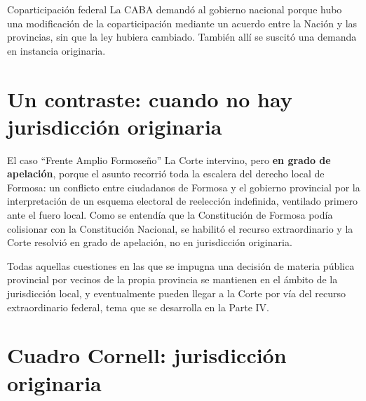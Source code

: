 \documentclass[12pt,oneside]{book}
\begin{document}
\begin{example}{Coparticipación federal}
La CABA demandó al gobierno nacional porque hubo una modificación de la coparticipación mediante un acuerdo entre la Nación y las provincias, sin que la ley hubiera cambiado. También allí se suscitó una demanda en instancia originaria.
\end{example}

\section{Un contraste: cuando no hay jurisdicción originaria}

\begin{example}{El caso ``Frente Amplio Formoseño''}
La Corte intervino, pero \textbf{en grado de apelación}, porque el asunto recorrió toda la escalera del derecho local de Formosa: un conflicto entre ciudadanos de Formosa y el gobierno provincial por la interpretación de un esquema electoral de reelección indefinida, ventilado primero ante el fuero local. Como se entendía que la Constitución de Formosa podía colisionar con la Constitución Nacional, se habilitó el recurso extraordinario y la Corte resolvió en grado de apelación, no en jurisdicción originaria.
\end{example}

Todas aquellas cuestiones en las que se impugna una decisión de materia pública provincial por vecinos de la propia provincia se mantienen en el ámbito de la jurisdicción local, y eventualmente pueden llegar a la Corte por vía del recurso extraordinario federal, tema que se desarrolla en la Parte IV.

\section{Cuadro Cornell: jurisdicción originaria}
\end{document}
